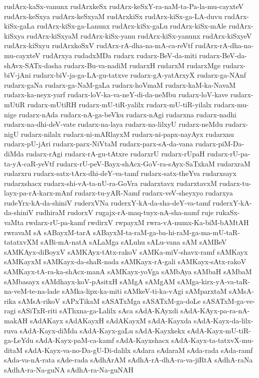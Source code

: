 {rudArx-kaSx-vanunx
rudArxkeSx
rudArx-keSxY-ra-naM-ta-Pa-la-mu-cayxteV
rudArx-keSxya
rudArx-keSxyaM
rudArxkiSx
rudArx-kiSx-ga-LA-duvu
rudArx-kiSx-gaLa
rudArx-kiSx-ga-Lanunx
rudArx-kiSx-gaLu
rudArx-kiSx-mAle
rudArx-kiSxya
rudArx-kiSxyaM
rudArx-kiSx-yanu
rudArx-kiSx-yanunx
rudArx-kiSxyeV
rudArx-kiSxyu
rudArxkoSxV
rudArx-rA-dha-na-mA-ca-reVtf
rudArx-rA-dha-na-mu-cayxteV
rudArxya
rudadxMDa
rudarx
rudarx-BeV-da-miti
rudarx-BeV-da-shAvx-SATx-dasha
rudarx-Bu-va-nadiM
rudarxH
rudarxM
rudarxMge
rudarx-biV-jAni
rudarx-biV-ja-ga-LA-gu-tatxve
rudarx-gA-yatArxyX
rudarx-ga-NAnf
rudarx-gaNa
rudarx-ga-NaM-gaLa
rudarx-hoVmaM
rudarx-kaM-ka-NavaM
rudarx-ka-neyx-yarf
rudarx-loV-ka-va-neY-di-da-neMbu
rudarx-loV-kave
rudarx-mUtiR
rudarx-mUtiRH
rudarx-mU-tiR-yalilx
rudarx-mU-tiR-yilalx
rudarx-mu-nige
rudarx-nAda
rudarx-nA-ga-beVku
rudarx-nAgi
rudarxna
rudarx-nadhi
rudarx-na-dhi-deV-vate
rudarx-na-laya
rudarx-na-lilxyU
rudarx-neMdu
rudarx-nigU
rudarx-nilalx
rudarx-ni-mARlayxM
rudarx-ni-papx-nayAyx
rudarxnu
rudarx-pU-jAri
rudarx-parx-NiVtaM
rudarx-parx-sA-da-vana
rudarx-piM-Da-diMda
rudarx-rAgi
rudarx-rA-gu-tAtxre
rudarxrU
rudarx-rUpaH
rudarx-rU-pa-ta-yA-caR-yeVtf
rudarx-rU-peV-Bayx-shAcx-GoV-ra-sAyx-SaTxkaM
rudarxraM
rudarxru
rudarx-satx-tArx-dhi-deY-va-tamf
rudarx-satx-theYva
rudarxsayx
rudarxshacx
rudarx-shi-vA-ta-nU-ra-GoVra
rudarxtavx
rudarxtavxM
rudarx-tu-layx-pa-rA-karx-mAnf
rudarx-tu-yAR-Namf
rudarx-veV-sheyxyo
rudarxya
rudeYrx-kA-da-shiniV
ruderxVNa
ruderxY-kA-da-sha-deY-va-tamf
ruderxY-kA-da-shiniV
rudhiraM
rudorxV
rugajx-rA-maq-tuyx-nA-sha-namf
ruje
rukaSx-vaMta
rwdarx-rU-pa-kamf
rwdirxV
rwpayxM
rwra-vA-numx-Ka-biM-bAMtAH
rwravaM
sA
sABayxM-tarA
sABayxM-ta-raM-ga-ba-hi-raM-ga-ma-mU-taR-tatatxvXM
sABi-mA-natA
sALaMga
sALuhu
sALu-vana
sAM
sAMBeV
sAMKAyx-diBoyxV
sAMKAyx-tAtx-rakoV
sAMKa-miV-shavx-ramf
sAMKayx
sAMKayxM
sAMKayx-da-shaR-nada
sAMKayx-rA-gali
sAMKayx-sAtx-rakoV
sAMKayx-tA-ra-ka-shAcx-manA
sAMKayx-yoVga
sAMbAya
sAMbaH
sAMbaM
sAMbasayx
sAMdhayx-koV-pAsitxH
sAMgA
sAMgAM
sAMga-kirx-yA-va-taR-na-veM-te-na-lade
sAMka-lipx-ka-miti
sAMkeV-ti-ka-vAgi
sAMparxtaM
sAMsA-rika
sAMsA-rikoV
sAPxTikaM
sASATxMga
sASATxM-ga-doLe
sASATxM-ga-ve-ragi
sASiTxR-riti
sAThxna-ga-Lalilx
sAca
sAdA-KAyxdi
sAdA-KAyx-pa-ra-nA-makAH
sAdAKayx
sAdAKayxH
sAdAKayxM
sAdA-Kayxda
sAdA-Kayx-da-lilx-ruva
sAdA-Kayx-diMda
sAdA-Kayx-gaLu
sAdA-Kayxkekx
sAdA-Kayx-mU-tiR-ga-LeYdu
sAdA-Kayx-paM-ca-kamf
sAdA-Kayxshacx
sAdA-Kayx-ta-tatxvX-mu-ditaM
sAdA-Kayx-va-no-Da-gU-Di-dalilx
sAdara
sAdaraM
sAda-rada
sAda-ramf
sAda-va-nA-rata
sAde-rada
sAdhArAM
sAdhA-rA-dhA-ra-va-jiRtA
sAdhA-raNa
sAdhA-ra-Na-guNA
sAdhA-ra-Na-guNAH
}
